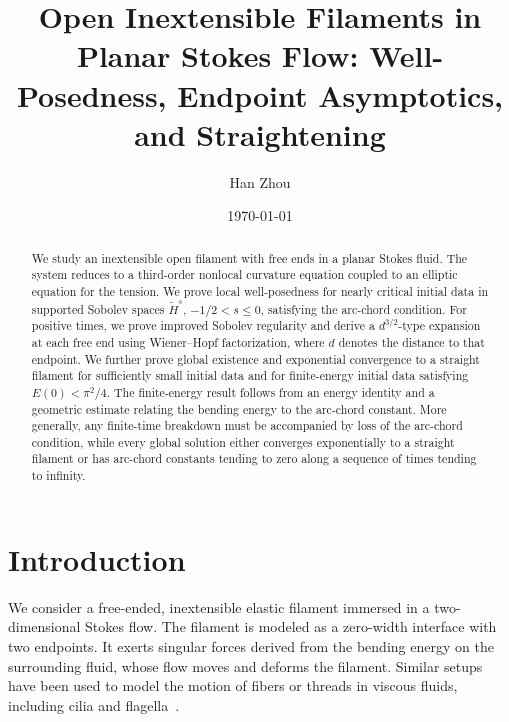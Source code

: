 \documentclass[11pt,reqno]{amsart}
\title[Open Inextensible Filaments in Stokes Flow]
{Open Inextensible Filaments in Planar Stokes Flow: Well-Posedness, Endpoint Asymptotics, and Straightening}
\author{Han Zhou}
\date{\today}
\theoremstyle{plain}
\theoremstyle{definition}
\numberwithin{equation}{section}
\begin{document}
\begin{abstract}
We study an inextensible open filament with free ends in a planar Stokes fluid. The system reduces to a third-order nonlocal curvature equation coupled to an elliptic equation for the tension. We prove local well-posedness for nearly critical initial data in supported Sobolev spaces $\widetilde H^s$, $-1/2<s\le0$, satisfying the arc-chord condition. For positive times, we prove improved Sobolev regularity and derive a $d^{3/2}$-type expansion at each free end using Wiener--Hopf factorization, where $d$ denotes the distance to that endpoint. We further prove global existence and exponential convergence to a straight filament for sufficiently small initial data and for finite-energy initial data satisfying $E(0)<\pi^2/4$. The finite-energy result follows from an energy identity and a geometric estimate relating the bending energy to the arc-chord constant. More generally, any finite-time breakdown must be accompanied by loss of the arc-chord condition, while every global solution either converges exponentially to a straight filament or has arc-chord constants tending to zero along a sequence of times tending to infinity.
\end{abstract}

\maketitle

\tableofcontents

\section{Introduction}



We consider a free-ended, inextensible elastic filament immersed in a two-dimensional Stokes flow.
The filament is modeled as a zero-width interface with two endpoints. It exerts singular forces derived from the bending energy on the surrounding fluid, whose flow moves and deforms the filament.
Similar setups have been used to model the motion of fibers or threads in viscous fluids, including cilia and flagella~\cite{TornbergShelley2004,EtienneLoheacSaramito2010Inextensible,BouzarthLaytonYoung2011Cellular,LiLayton2012OpenInterface}.
\end{document}
